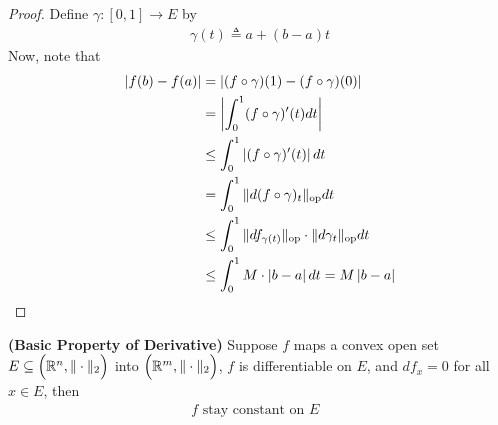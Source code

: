 \documentclass{report}
\begin{document}
\begin{proof}
Define $\gamma:[0,1]\rightarrow E$ by 
\begin{align*}
\gamma (t)\triangleq a+(b-a)t
\end{align*}
Now, note that 
\begin{align*}
\left|f(b)-f(a)\right|&= \left|(f\circ \gamma )(1)-(f\circ \gamma )(0)\right|\\
&= \left|\int_0^ 1(f\circ \gamma )'(t)dt\right|\\
&\leq \int_0^1 \left|(f\circ \gamma )'(t)\right|dt\\
&=\int_0^1 \| d(f\circ \gamma )_t \|_\text{op}dt\\
&\leq \int_0^1 \| df_{\gamma (t)} \|_\text{op}\cdot \| d\gamma_t \|_\text{op}dt\\
&\leq \int_0^1 M\cdot \left|b-a\right|dt=M\left|b-a\right|
\end{align*}
\end{proof}
\begin{corollary}
\label{BPoD}
\textbf{(Basic Property of Derivative)} Suppose $f$ maps a convex open set $E\subseteq \Big(\mathbb{R}^n,\| \cdot \|_2 \Big)$ into $\Big(\mathbb{R}^m,\| \cdot \|_2 \Big)$, $f$ is differentiable on $E$, and $df_x=0$ for all $x\in E$, then
\begin{align*}
f\text{ stay constant on $E$ }
\end{align*}
\end{corollary}
\end{document}
